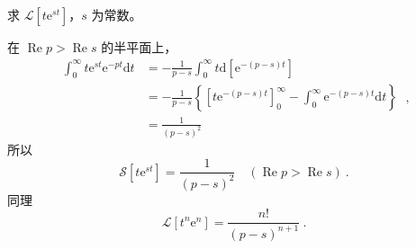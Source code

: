 \begin{example}{}
求 $\mathscr L[t\mathrm e^{st}]$，$s$ 为常数。

在 $\operatorname{Re} p>\operatorname{Re} s$ 的半平面上，
\begin{equation}
\begin{aligned} \int_{0}^{\infty} t \mathrm{e}^{s t} \mathrm{e}^{-p t} \mathrm{d} t &=-\frac{1}{p-s} \int_{0}^{\infty} t \mathrm{d}\left[\mathrm{e}^{-(p-s) t}\right] \\ &=-\frac{1}{p-s}\left\{\left[t \mathrm{e}^{-(p-s) t}\right]_{0}^{\infty}-\int_{0}^{\infty} \mathrm{e}^{-(p-s) t} \mathrm{d} t\right\} \\ &=\frac{1}{(p-s)^{2}} \end{aligned}~,
\end{equation}
所以
\begin{equation}
\mathscr{S}\left[t \mathrm{e}^{s t}\right]=\frac{1}{(p-s)^{2}} \quad(\operatorname{Re} p>\operatorname{Re} s)~.
\end{equation}
同理
\begin{equation}
\mathscr{L}\left[t^{n} \mathrm{e}^{n}\right]=\frac{n !}{(p-s)^{n+1}}~.
\end{equation}
\end{example}
